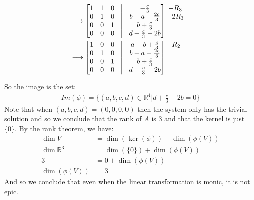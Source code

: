 \documentclass[final,expand]{problemset}
\begin{document}
{\begin{align*}
\begin{matrix}
			\end{matrix}\\
			&\longrightarrow
			\begin{bmatrix}
				1 & 1 & 0 &\vline& -\frac{c}{3}\\ 0 & 1 & 0&\vline& b - a - \frac{2c}{3} \\ 0 & 0 & 1 &\vline& b + \frac{c}{3}\\ 0 & 0 & 0 &\vline& d + \frac{c}{3} - 2b
			\end{bmatrix}\begin{matrix}
				 -R_3\\ -2R_3  \\ \\\\
			\end{matrix}\\
			&\longrightarrow
			\begin{bmatrix}
				1 & 0 & 0 &\vline& a - b + \frac{c}{3}\\ 0 & 1 & 0&\vline& b - a - \frac{2c}{3} \\ 0 & 0 & 1 &\vline& b + \frac{c}{3}\\ 0 & 0 & 0 &\vline& d + \frac{c}{3} - 2b
			\end{bmatrix}\begin{matrix}
				 -R_2\\   \\ \\\\
			\end{matrix}\\
	\end{align*}

	So the image is the set:
	\begin{align*}
		Im(\phi) = \{(a, b, c, d) \in \mathbb{R}^4| d + \frac{c}{3} - 2b = 0 \}
	\end{align*}
	Note that when $(a, b, c, d) = (0, 0, 0, 0)$ then the system only has the trivial solution and so we conclude that the rank of $A$ is $3$ and that the kernel is just $\{0\}$. By the rank theorem, we have:
	\begin{align*}
		\dim V &= \dim(\ker(\phi)) + \dim(\phi(V))\\
		\dim \mathbb{R}^3 &= \dim(\{0\}) + \dim(\phi(V))\\
		3 &= 0 + \dim(\phi(V))\\
		\dim(\phi(V)) &= 3
	\end{align*}
	And so we conclude that even when the linear transformation is monic, it is not epic.
}
\end{document}
